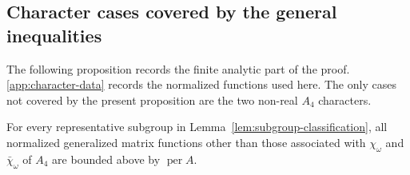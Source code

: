 \documentclass[10pt,twoside]{siamart1116}
\newcommand{\per}{\operatorname{per}}
\begin{document}
\subsection{Character cases covered by the general inequalities}

The following proposition records the finite analytic part of the proof.
\ref{app:character-data} records the normalized functions used
here.  The only cases not covered by the present proposition are the two
non-real $A_4$ characters.

\begin{proposition}\label{prop:elementary-cases}
For every representative subgroup in Lemma~\ref{lem:subgroup-classification},
all normalized generalized matrix functions other than those associated with
$\chi_\omega$ and
$\bar\chi_\omega$ of $A_4$ are bounded above by $\per A$.
\end{proposition}
\end{document}
